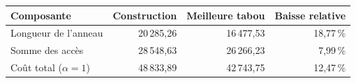 \begin{tabular}{lrrr}
\toprule
Composante & Construction & Meilleure tabou & Baisse relative \\
\midrule
Longueur de l'anneau & 20\,285{,}26 & 16\,477{,}53 & 18{,}77\,\% \\
Somme des accès & 28\,548{,}63 & 26\,266{,}23 & 7{,}99\,\% \\
Coût total ($\alpha=1$) & 48\,833{,}89 & 42\,743{,}75 & 12{,}47\,\% \\
\bottomrule
\end{tabular}
